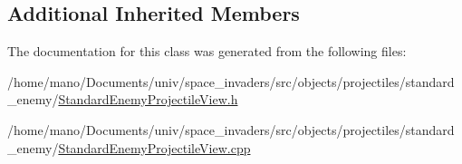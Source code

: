 \subsection*{Additional Inherited Members}


The documentation for this class was generated from the following files\+:\begin{DoxyCompactItemize}
\item 
/home/mano/\+Documents/univ/space\+\_\+invaders/src/objects/projectiles/standard\+\_\+enemy/\hyperlink{StandardEnemyProjectileView_8h}{Standard\+Enemy\+Projectile\+View.\+h}\item
/home/mano/\+Documents/univ/space\+\_\+invaders/src/objects/projectiles/standard\+\_\+enemy/\hyperlink{StandardEnemyProjectileView_8cpp}{Standard\+Enemy\+Projectile\+View.\+cpp}\end{DoxyCompactItemize}
